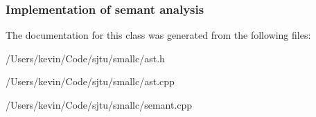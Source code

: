  \subsubsection*{Implementation of semant analysis }

The documentation for this class was generated from the following files\+:\begin{DoxyCompactItemize}
\item 
/\+Users/kevin/\+Code/sjtu/smallc/ast.\+h\item 
/\+Users/kevin/\+Code/sjtu/smallc/ast.\+cpp\item 
/\+Users/kevin/\+Code/sjtu/smallc/semant.\+cpp\end{DoxyCompactItemize}
